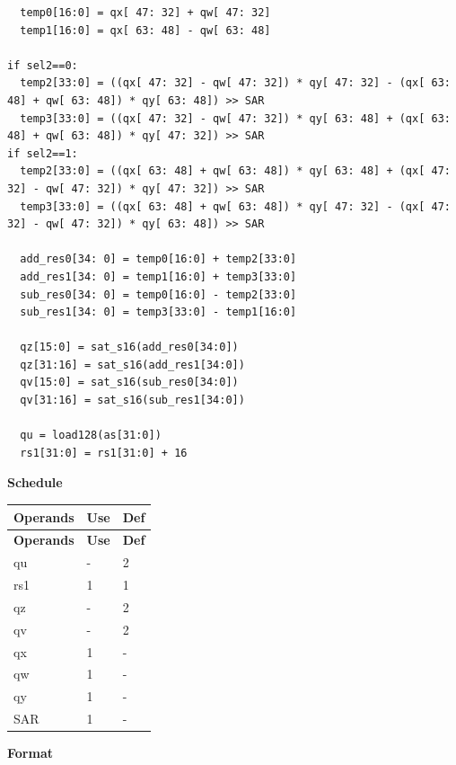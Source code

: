 \begin{lstlisting}
  temp0[16:0] = qx[ 47: 32] + qw[ 47: 32]
  temp1[16:0] = qx[ 63: 48] - qw[ 63: 48]

if sel2==0:
  temp2[33:0] = ((qx[ 47: 32] - qw[ 47: 32]) * qy[ 47: 32] - (qx[ 63: 48] + qw[ 63: 48]) * qy[ 63: 48]) >> SAR
  temp3[33:0] = ((qx[ 47: 32] - qw[ 47: 32]) * qy[ 63: 48] + (qx[ 63: 48] + qw[ 63: 48]) * qy[ 47: 32]) >> SAR
if sel2==1:
  temp2[33:0] = ((qx[ 63: 48] + qw[ 63: 48]) * qy[ 63: 48] + (qx[ 47: 32] - qw[ 47: 32]) * qy[ 47: 32]) >> SAR
  temp3[33:0] = ((qx[ 63: 48] + qw[ 63: 48]) * qy[ 47: 32] - (qx[ 47: 32] - qw[ 47: 32]) * qy[ 63: 48]) >> SAR

  add_res0[34: 0] = temp0[16:0] + temp2[33:0]
  add_res1[34: 0] = temp1[16:0] + temp3[33:0]
  sub_res0[34: 0] = temp0[16:0] - temp2[33:0]
  sub_res1[34: 0] = temp3[33:0] - temp1[16:0]

  qz[15:0] = sat_s16(add_res0[34:0])
  qz[31:16] = sat_s16(add_res1[34:0])
  qv[15:0] = sat_s16(sub_res0[34:0])
  qv[31:16] = sat_s16(sub_res1[34:0])

  qu = load128(as[31:0])
  rs1[31:0] = rs1[31:0] + 16
\end{lstlisting}

\textbf{Schedule}\\
\begin{longtable}[c]{|l|l|l|}
    \hline
    \rowcolor{lightgray}
    \textbf{Operands} & \textbf{Use} & \textbf{Def} \\\hline
    \endfirsthead
    \hline
    \rowcolor{lightgray}
     \textbf{Operands} & \textbf{Use} & \textbf{Def} \\\hline
    \endhead
    \hline
    \endfoot

  qu & - & 2 \\\hline
  rs1 & 1 & 1 \\\hline
  qz & - & 2 \\\hline
  qv & - & 2 \\\hline
  qx & 1 & - \\\hline
  qw & 1 & - \\\hline
  qy & 1 & - \\\hline
  SAR & 1 & -

\end{longtable}

\textbf{Format}\\

